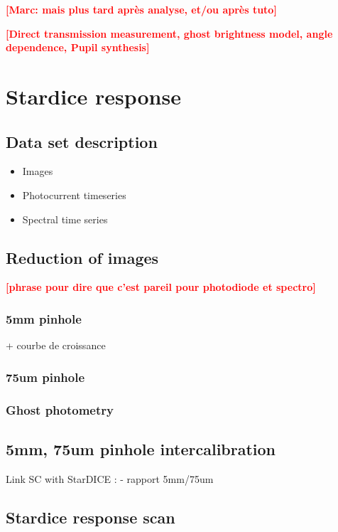 \documentclass[onecolumn]{aa}
\newcommand{\todo}[1]{\textbf{\textcolor{red}{[#1]}}\xspace}
\begin{document}
\todo{Marc: mais plus tard après analyse, et/ou après tuto}

\todo{Direct transmission measurement, ghost brightness model, angle dependence,  Pupil synthesis}


\section{Stardice response}
\label{sec:rsd}

\subsection{Data set description}
\label{sec:datadesc}

\begin{itemize}
\item Images
\item Photocurrent timeseries
\item Spectral time series
\end{itemize}

\subsection{Reduction of images}
\label{sec:photometry}

\todo{phrase pour dire que c'est pareil pour photodiode et spectro}

\subsubsection{5mm pinhole}

+ courbe de croissance

\subsubsection{75um pinhole}

\subsubsection{Ghost photometry}

\subsection{5mm, 75um pinhole intercalibration}

Link SC with StarDICE :
- rapport 5mm/75um

\subsection{Stardice response scan}
\end{document}
